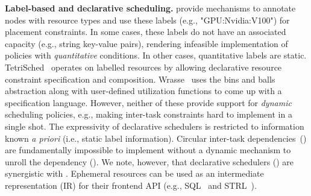 \noindent\textbf{Label-based and declarative scheduling.} 
\cite{kubernetes,yarn,omega,classads,borg} provide mechanisms to annotate nodes with resource types and use these labels (e.g., "GPU:Nvidia:V100") for placement constraints.
In some cases, these labels do not have an associated capacity (e.g., string key-value pairs), rendering infeasible implementation of policies with \emph{quantitative} conditions. 
In other cases, quantitative labels are static.
TetriSched~\cite{tetrisched} operates on labelled resources by allowing declarative resource constraint specification and composition. Wrasse~\cite{wrasse-socc12} uses the bins and balls abstraction along with user-defined utilization functions to come up with a specification language. However, neither of these provide support for \textit{dynamic} scheduling policies, e.g., making inter-task constraints hard to implement in a single shot. %
The expressivity of declarative schedulers is restricted to information known \textit{a priori} (i.e., static label information). Circular inter-task dependencies~(\cite{naiad-sosp13}) are fundamentally impossible to implement without a dynamic mechanism to unroll the dependency ().
We note, however, that declarative schedulers (\cite{tetrisched,dcm-osdi20}) are synergistic with \name{}.
Ephemeral resources can be used as an intermediate representation (IR) for their frontend API (e.g., SQL~\cite{dcm-osdi20} and STRL~\cite{tetrisched}).

